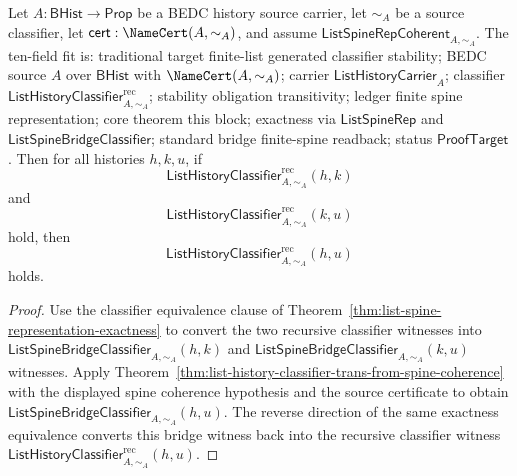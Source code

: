 \begin{theorem}
\label{thm:list-recursive-history-classifier-trans-from-spine-coherence}
Let $A:\mathsf{BHist}\to\mathsf{Prop}$ be a BEDC history source carrier, let
$\sim_A$ be a source classifier, let $\mathsf{cert}:\NameCert(A,\sim_A)$, and
assume $\mathsf{ListSpineRepCoherent}_{A,\sim_A}$. The ten-field fit is:
traditional target finite-list generated classifier stability; BEDC source $A$
over $\mathsf{BHist}$ with $\NameCert(A,\sim_A)$; carrier
$\mathsf{ListHistoryCarrier}_A$; classifier
$\mathsf{ListHistoryClassifier}^{\mathrm{rec}}_{A,\sim_A}$; stability
obligation transitivity; ledger finite spine representation; core theorem this
block; exactness via $\mathsf{ListSpineRep}$ and
$\mathsf{ListSpineBridgeClassifier}$; standard bridge finite-spine readback;
status $\mathsf{ProofTarget}$. Then for all histories $h,k,u$, if
$$
\mathsf{ListHistoryClassifier}^{\mathrm{rec}}_{A,\sim_A}(h,k)
$$
and
$$
\mathsf{ListHistoryClassifier}^{\mathrm{rec}}_{A,\sim_A}(k,u)
$$
hold, then
$$
\mathsf{ListHistoryClassifier}^{\mathrm{rec}}_{A,\sim_A}(h,u)
$$
holds.
\end{theorem}
\begin{proof}
Use the classifier equivalence clause of
Theorem~\ref{thm:list-spine-representation-exactness} to convert the two
recursive classifier witnesses into
$\mathsf{ListSpineBridgeClassifier}_{A,\sim_A}(h,k)$ and
$\mathsf{ListSpineBridgeClassifier}_{A,\sim_A}(k,u)$ witnesses. Apply
Theorem~\ref{thm:list-history-classifier-trans-from-spine-coherence} with the
displayed spine coherence hypothesis and the source certificate to obtain
$\mathsf{ListSpineBridgeClassifier}_{A,\sim_A}(h,u)$. The reverse direction of
the same exactness equivalence converts this bridge witness back into the
recursive classifier witness
$\mathsf{ListHistoryClassifier}^{\mathrm{rec}}_{A,\sim_A}(h,u)$.
\end{proof}

